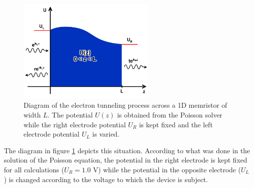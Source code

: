 \begin{center}
  \begin{figure}[h!]
    \begin{center}
      \includegraphics[width=0.6\textwidth]{img/transm-01.jpg}    
      \caption{Diagram of the electron tunneling process across a 1D memristor of width $L$. The potential $U(z)$ is obtained from the Poisson solver while the right electrode potential $U_R$ is kept fixed and the left electrode potential $U_L$ is varied.} 
      \label{fig:transm-01} 
    \end{center}
  \end{figure}
\end{center}

The diagram in figure \ref{fig:transm-01} depicts this situation. According to what was done in the solution of the Poisson equation, the potential in the right electrode is kept fixed for all calculations ($U_R = 1.0$ V) while the potential in the opposite electrode ($U_L$) is changed according to the voltage to which the device is subject. 

